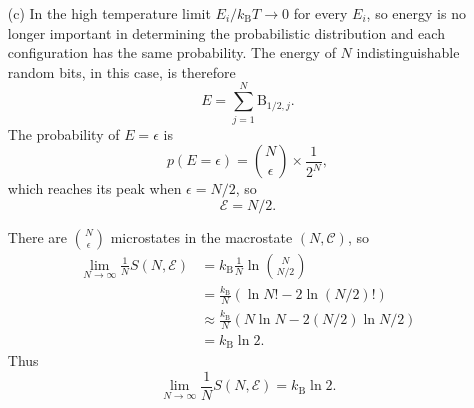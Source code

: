 \documentclass[hyperref, a4paper]{article}
\begin{document}
\begin{itemize}
\item[(c)] In the high temperature limit $E_i / k_{\text{B}} T \to 0$ for every $E_{i}$,
so energy is no longer important in determining the probabilistic distribution 
and each configuration has the same probability.
The energy of $N$ indistinguishable random bits, in this case, is therefore 
\begin{equation}
    E = \sum_{j=1}^N \mathrm{B}_{1/2, j}.
\end{equation}
The probability of $E = \epsilon$ is 
\begin{equation}
    p(E = \epsilon) = \binom{N}{\epsilon} \times \frac{1}{2^N},
\end{equation}
which reaches its peak when $\epsilon = N / 2$,
so 
\begin{equation}
    \mathcal{E} = N / 2.
\end{equation}

There are $\binom{N}{\epsilon}$ microstates in the macrostate $(N ,\mathcal{C})$,
so 
\[
    \begin{aligned}
        \lim_{N \to \infty} \frac{1}{N} S(N, \mathcal{E}) &= k_{\text{B}} \frac{1}{N} \ln \binom{N}{N / 2} \\
        &= \frac{k_{\text{B}}}{N} (\ln N! - 2 \ln (N/2)!) \\
        &\approx \frac{k_{\text{B}}}{N} (N \ln N - 2 (N / 2) \ln N/2 ) \\
        &= k_{\text{B}} \ln 2.
    \end{aligned}
\]
Thus 
\begin{equation}
    \lim_{N \to \infty} \frac{1}{N} S(N, \mathcal{E}) = k_{\text{B}} \ln 2.
\end{equation}


\end{itemize}
\end{document}
